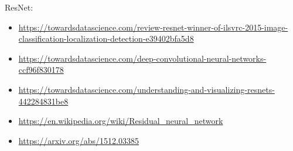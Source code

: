 ResNet:

\begin{itemize}
	\item \url{https://towardsdatascience.com/review-resnet-winner-of-ilsvrc-2015-image-classification-localization-detection-e39402bfa5d8}
	\item \url{https://towardsdatascience.com/deep-convolutional-neural-networks-ccf96f830178}
	\item \url{https://towardsdatascience.com/understanding-and-visualizing-resnets-442284831be8}
	\item \url{https://en.wikipedia.org/wiki/Residual_neural_network}
	\item \url{https://arxiv.org/abs/1512.03385}
\end{itemize}
